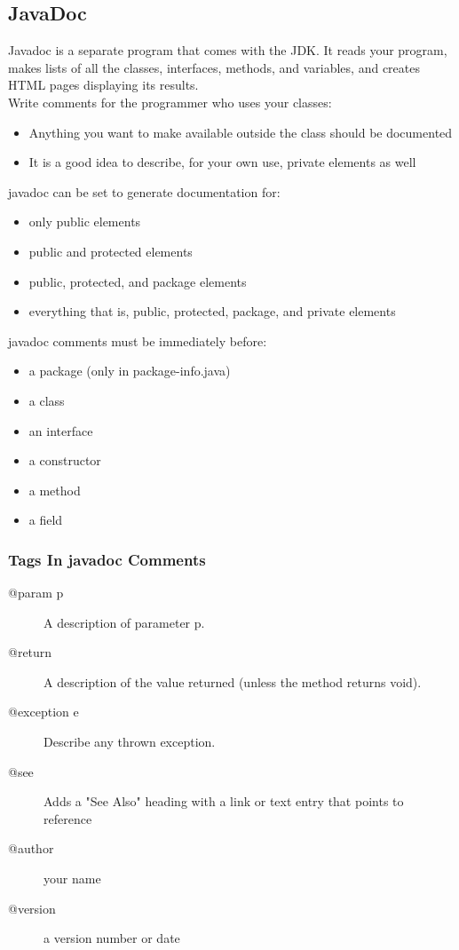 \documentclass[a4paper,10pt]{article}
\begin{document}
\subsection{JavaDoc}
Javadoc is a separate program that comes with the JDK. It reads your program, makes lists of all the classes, interfaces, methods, and variables, and creates HTML pages displaying its results. \\
Write comments for the programmer who uses your classes: 
\begin{itemize}
	\item Anything you want to make available outside the class should be documented
	\item It is a good idea to describe, for your own use, private elements as well
\end{itemize}
javadoc can be set to generate documentation for:
\begin{itemize}
	\item only public elements
	\item public and protected elements
	\item public, protected, and package elements
	\item everything that is, public, protected, package, and private elements
\end{itemize}
javadoc comments must be immediately before:
\begin{itemize}
	\item a package (only in package-info.java)
	\item a class
	\item an interface
	\item a constructor
	\item a method	
	\item a field
\end{itemize}

\subsubsection{Tags In javadoc Comments}
\begin{description}
	\item[@param p] A description of parameter p.
	\item[@return] A description of the value returned (unless the method returns void).
	\item[@exception e] Describe any thrown exception.
	\item[@see] Adds a "See Also" heading with a link or text entry that points to reference
	\item[@author] your name
	\item[@version] a version number or date
\end{description}
\end{document}

